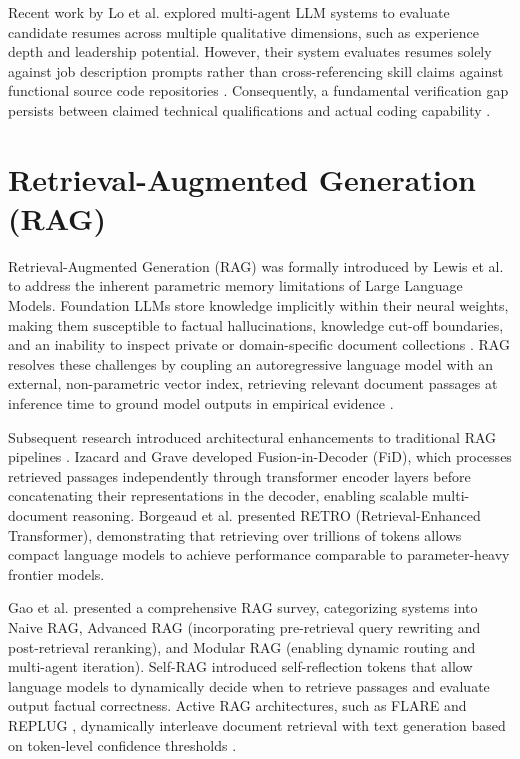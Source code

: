 Recent work by Lo et al. \cite{ref23} explored multi-agent LLM systems to evaluate candidate resumes across multiple qualitative dimensions, such as experience depth and leadership potential. However, their system evaluates resumes solely against job description prompts rather than cross-referencing skill claims against functional source code repositories \cite{ref20, ref23}. Consequently, a fundamental verification gap persists between claimed technical qualifications and actual coding capability \cite{ref15, ref16, ref24}.

\section{Retrieval-Augmented Generation (RAG)}

Retrieval-Augmented Generation (RAG) was formally introduced by Lewis et al. \cite{ref32} to address the inherent parametric memory limitations of Large Language Models. Foundation LLMs store knowledge implicitly within their neural weights, making them susceptible to factual hallucinations, knowledge cut-off boundaries, and an inability to inspect private or domain-specific document collections \cite{ref9, ref17, ref18}. RAG resolves these challenges by coupling an autoregressive language model with an external, non-parametric vector index, retrieving relevant document passages at inference time to ground model outputs in empirical evidence \cite{ref33, ref45, ref32}.

Subsequent research introduced architectural enhancements to traditional RAG pipelines \cite{ref33}. Izacard and Grave \cite{ref45} developed Fusion-in-Decoder (FiD), which processes retrieved passages independently through transformer encoder layers before concatenating their representations in the decoder, enabling scalable multi-document reasoning. Borgeaud et al. \cite{ref5} presented RETRO (Retrieval-Enhanced Transformer), demonstrating that retrieving over trillions of tokens allows compact language models to achieve performance comparable to parameter-heavy frontier models.

Gao et al. \cite{ref33} presented a comprehensive RAG survey, categorizing systems into Naive RAG, Advanced RAG (incorporating pre-retrieval query rewriting and post-retrieval reranking), and Modular RAG (enabling dynamic routing and multi-agent iteration). Self-RAG \cite{ref2} introduced self-reflection tokens that allow language models to dynamically decide when to retrieve passages and evaluate output factual correctness. Active RAG architectures, such as FLARE \cite{ref46} and REPLUG \cite{ref67}, dynamically interleave document retrieval with text generation based on token-level confidence thresholds \cite{ref68, ref69}.

